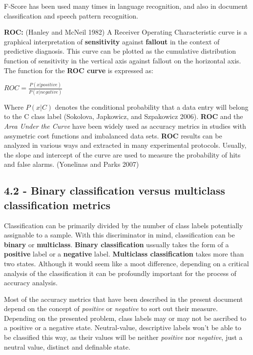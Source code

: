 \documentclass[]{article}
\begin{document}
F-Score has been used many times in language recognition, and also in
document classification and speech pattern recognition.

\textbf{ROC:} (Hanley and McNeil 1982) A Receiver Operating
Characteristic curve is a graphical interpretation of
\textbf{sensitivity} against \textbf{fallout} in the context of
predictive diagnosis. This curve can be plotted as the cumulative
distribution function of sensitivity in the vertical axis against
fallout on the horizontal axis. The function for the \textbf{ROC curve}
is expressed as:

\(ROC = \frac{P(x \vert positive)}{P(x \vert negative)}\)

Where \(P(x \vert C)\) denotes the conditional probability that a data
entry will belong to the C class label (Sokolova, Japkowicz, and
Szpakowicz 2006). \textbf{ROC} and the \emph{Area Under the Curve} have
been widely used as accuracy metrics in studies with assymetric cost
functions and imbalanced data sets. \textbf{ROC} results can be analyzed
in various ways and extracted in many experimental protocols. Usually,
the slope and intercept of the curve are used to measure the probability
of hits and false alarms. (Yonelinas and Parks 2007)

\subsection{4.2 - Binary classification versus multiclass classification
metrics}\label{binary-classification-versus-multiclass-classification-metrics}

Classification can be primarily divided by the number of class labels
potentially assignable to a sample. With this discriminator in mind,
classification can be \textbf{binary} or \textbf{multiclass}.
\textbf{Binary classification} ussually takes the form of a
\textbf{positive} label or a \textbf{negative} label. \textbf{Multiclass
classification} takes more than two states. Although it would seem like
a moot difference, depending on a critical analysis of the
classification it can be profoundly important for the process of
accuracy analysis.

Most of the accuracy metrics that have been described in the present
document depend on the concept of \emph{positive} or \emph{negative} to
sort out their measure. Depending on the presented problem, class labels
may or may not be ascribed to a positive or a negative state.
Neutral-value, descriptive labels won't be able to be classified this
way, as their values will be neither \emph{positive} nor
\emph{negative}, just a neutral value, distinct and definable state.
\end{document}
